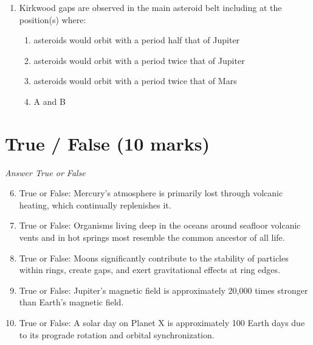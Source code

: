 \documentclass[12pt]{article}
\begin{document}
\begin{enumerate}[label=\arabic*.]
\begin{enumerate}[label=(\alph*)]
    \item in the center of the asteroid belt
    \item on orbits that cross Earth's orbit
    \item surrounding Jupiter
    \item along Jupiter's orbit 60^\ensuremath{\circ} ahead of and behind Jupiter
\end{enumerate}
\item Kirkwood gaps are observed in the main asteroid belt including at the position(s) where:
\begin{enumerate}[label=(\alph*)]
    \item asteroids would orbit with a period half that of Jupiter
    \item asteroids would orbit with a period twice that of Jupiter
    \item asteroids would orbit with a period twice that of Mars
    \item A and B
\end{enumerate}
\end{enumerate}

\section*{True / False (10 marks)}
\textit{Answer True or False}
\begin{enumerate}[label=\arabic*.]
\setcounter{enumi}{5}
\item True or False: Mercury's atmosphere is primarily lost through volcanic heating, which continually replenishes it.
\item True or False: Organisms living deep in the oceans around seafloor volcanic vents and in hot springs most resemble the common ancestor of all life.
\item True or False: Moons significantly contribute to the stability of particles within rings, create gaps, and exert gravitational effects at ring edges.
\item True or False: Jupiter's magnetic field is approximately 20,000 times stronger than Earth's magnetic field.
\item True or False: A solar day on Planet X is approximately 100 Earth days due to its prograde rotation and orbital synchronization.
\end{enumerate}
\end{document}
